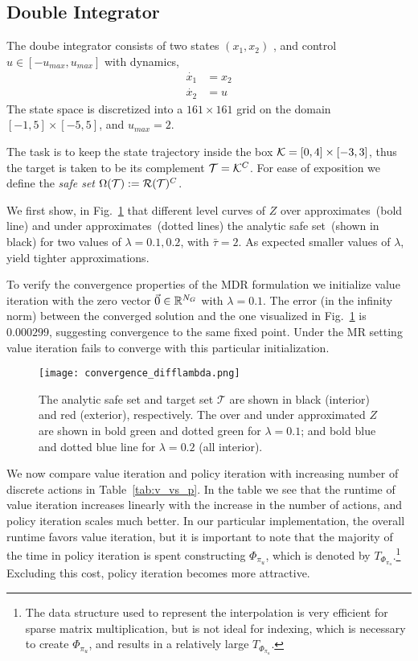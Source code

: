 \subsection{Double Integrator}
The doube integrator consists of two states $(x_1, x_2)$ , and  control $u \in [-u_{max}, u_{max}]$ with dynamics,
\begin{equation}
\begin{split}
\dot{x_1} & = x_2 \\
\dot{x_2} & = u 
\end{split}
\end{equation}
\noindent The state space is discretized into a $161 \times 161$ grid on the domain $[-1,5] \times [-5,5]$, and $u_{max}=2$.

The task is to keep the state trajectory inside the box $\mathcal{K} = [0,4] \times [-3,3]$, thus the target is taken to be its complement $\mathcal{T}=\mathcal{K}^C$. For ease of exposition we define the \emph{safe set} $\Omega(\mathcal{T}) := \mathcal{R}(\mathcal{T})^C$.

We first show, in Fig.~\ref{fig:convergence} that different level curves of $Z$ over approximates~(bold line) and under approximates~(dotted lines) the analytic safe set~(shown in black) for two values of $\lambda = 0.1, 0.2$, with $\bar{\tau}=2$. As expected smaller values of $\lambda$, yield tighter approximations. 

To verify the convergence properties of the MDR formulation we initialize value iteration with the zero vector $\vec{0}\in \mathbb{R}^{N_G}$ with $\lambda=0.1$. The error (in the infinity norm) between the converged solution and the one visualized in Fig.~\ref{fig:convergence} is $0.000299$, suggesting convergence to the same fixed point. Under the MR setting value iteration fails to converge with this particular initialization.

\begin{figure}
\texttt{[image: convergence\_difflambda.png]}
\caption{The analytic safe set and target set $\mathcal{T}$ are shown in black (interior) and red (exterior), respectively. The over and under approximated $Z$ are shown in bold green and dotted green for $\lambda=0.1$; and bold blue and dotted blue line for $\lambda  = 0.2$ (all interior).}
\label{fig:convergence}
\end{figure}

We now compare value iteration and policy iteration with increasing number of discrete actions in Table~\ref{tab:v_vs_p}. In the table we see that the runtime of value iteration increases linearly with the increase in the number of actions, and policy iteration scales much better. In our particular implementation, the overall runtime favors value iteration, but it is important to note that the majority of the time in policy iteration is spent constructing $\Phi_{\pi_u}$, which is denoted by $T_{\Phi_{\pi_u}}$.\footnote{The data structure used to represent the interpolation is very efficient for sparse matrix multiplication, but is not ideal for indexing, which is necessary to create $\Phi_{\pi_u}$, and results in a relatively large $T_{\Phi_{\pi_u}}$.} Excluding this cost, policy iteration becomes more attractive.

